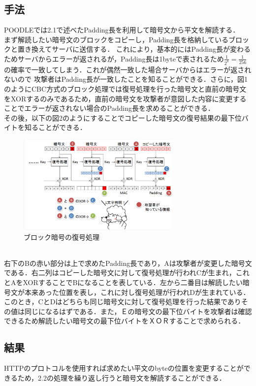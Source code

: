 \documentclass[dvipdfmx]{jarticle}
\begin{document}
\subsection{手法}
POODLEでは2.1で述べたPadding長を利用して暗号文から平文を解読する．
\\まず解読したい暗号文のブロックをコピーし，Padding長を格納しているブロックと置き換えてサーバに送信する．
これにより，基本的にはPadding長が変わるためサーバからエラーが返されるが，Padding長は1byteで表されるため$\frac{1}{2^8}=\frac{1}{256}$の確率で一致してしまう．これが偶然一致した場合サーバからはエラーが返されないので
攻撃者はPadding長が一致したことを知ることができる．さらに，図1のようにCBC方式のブロック処理では復号処理を行った暗号文と直前の暗号文をXORするのみであるため，直前の暗号文を攻撃者が意図した内容に変更することでエラーが返されない場合のPadding長を求めることができる．\cite{2}
\\
その後，以下の図2のようにすることでコピーした暗号文の復号結果の最下位バイトを知ることができる．\cite{1}
\begin{figure}[h]
  \centering
  \includegraphics[width = 8cm]{POODLE.png}
  \caption{ブロック暗号の復号処理}
\end{figure}
\\右下のBの赤い部分は上で求めたPadding長であり，Aは攻撃者が変更した暗号文である．右二列はコピーした暗号文に対して復号処理が行われCが生まれ，これとAをXORすることでBになることを表している．左から二番目は解読したい暗号文が本来あった位置を表し，これに対し復号処理が行われDが生まれている．
このとき，CとDはどちらも同じ暗号文に対して復号処理を行った結果でありその値は同じになるはずである．また，Ｅの暗号文の最下位バイトを攻撃者は確認できるため解読したい暗号文の最下位バイトをＸＯＲすることで求められる．
\subsection{結果}
HTTPのプロトコルを使用すれば求めたい平文のbyteの位置を変更することができるため，2.2の処理を繰り返し行うと暗号文を解読することができる．
\end{document}
